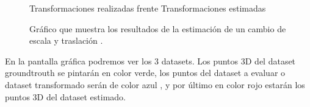 \begin{figure}[H]
\begin{center}
\hspace{0.5cm}
\end{center}
\caption{Transformaciones realizadas frente Transformaciones estimadas }
\end{figure}


\begin{figure}[H]
\begin{center}
\hspace{0.5cm}

\end{center}

\caption{Gráfico que muestra los resultados de la estimación de un cambio de escala y traslación .}
\end{figure}

En la pantalla gráfica podremos ver los 3 datasets. Los puntos 3D del dataset groundtrouth se pintarán en color verde, los puntos del dataset a evaluar o dataset transformado serán de color azul , y por último en color rojo estarán los puntos 3D del dataset estimado.


\clearpage

